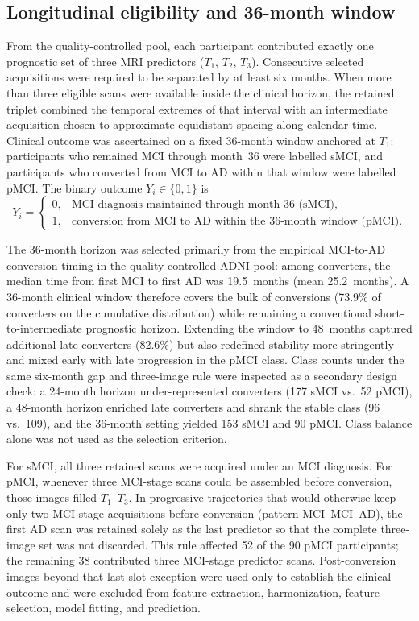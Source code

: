 \documentclass[review]{elsarticle}
\begin{document}
	\subsection{Longitudinal eligibility and 36-month window}
	\label{subsec:longitudinal-window}
	
	From the quality-controlled pool, each participant contributed exactly one prognostic set of three MRI predictors ($T_1$, $T_2$, $T_3$). Consecutive selected acquisitions were required to be separated by at least six months. When more than three eligible scans were available inside the clinical horizon, the retained triplet combined the temporal extremes of that interval with an intermediate acquisition chosen to approximate equidistant spacing along calendar time. Clinical outcome was ascertained on a fixed 36-month window anchored at $T_1$: participants who remained MCI through month~36 were labelled sMCI, and participants who converted from MCI to AD within that window were labelled pMCI. The binary outcome $Y_i \in \{0,1\}$ is
	\begin{equation}
		Y_i =
		\begin{cases}
			0, & \text{MCI diagnosis maintained through month 36 (sMCI)},\\
			1, & \text{conversion from MCI to AD within the 36-month window (pMCI)}.
		\end{cases}
		\label{eq:temporal_outcome}
	\end{equation}
	
	The 36-month horizon was selected primarily from the empirical MCI-to-AD conversion timing in the quality-controlled ADNI pool: among converters, the median time from first MCI to first AD was 19.5~months (mean 25.2~months). A 36-month clinical window therefore covers the bulk of conversions (73.9\% of converters on the cumulative distribution) while remaining a conventional short-to-intermediate prognostic horizon. Extending the window to 48~months captured additional late converters (82.6\%) but also redefined stability more stringently and mixed early with late progression in the pMCI class. Class counts under the same six-month gap and three-image rule were inspected as a secondary design check: a 24-month horizon under-represented converters (177 sMCI vs.\ 52 pMCI), a 48-month horizon enriched late converters and shrank the stable class (96 vs.\ 109), and the 36-month setting yielded 153 sMCI and 90 pMCI. Class balance alone was not used as the selection criterion.
	
	For sMCI, all three retained scans were acquired under an MCI diagnosis. For pMCI, whenever three MCI-stage scans could be assembled before conversion, those images filled $T_1$--$T_3$. In progressive trajectories that would otherwise keep only two MCI-stage acquisitions before conversion (pattern MCI--MCI--AD), the first AD scan was retained solely as the last predictor so that the complete three-image set was not discarded. This rule affected 52 of the 90 pMCI participants; the remaining 38 contributed three MCI-stage predictor scans. Post-conversion images beyond that last-slot exception were used only to establish the clinical outcome and were excluded from feature extraction, harmonization, feature selection, model fitting, and prediction.
	
\end{document}
